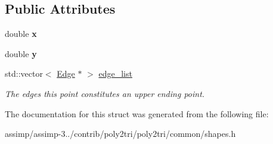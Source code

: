 \subsection*{Public Attributes}
\begin{DoxyCompactItemize}
\item 
\hypertarget{structp2t_1_1_point_a49ca18e331005473fabe8352ae30aa87}{double {\bfseries x}}\label{structp2t_1_1_point_a49ca18e331005473fabe8352ae30aa87}

\item 
\hypertarget{structp2t_1_1_point_ac145d2fc2a314ba5d1f5f93b32888313}{double {\bfseries y}}\label{structp2t_1_1_point_ac145d2fc2a314ba5d1f5f93b32888313}

\item 
\hypertarget{structp2t_1_1_point_a116c82146cc0bf573baac56c77a9f90a}{std\+::vector$<$ \hyperlink{structp2t_1_1_edge}{Edge} $\ast$ $>$ \hyperlink{structp2t_1_1_point_a116c82146cc0bf573baac56c77a9f90a}{edge\+\_\+list}}\label{structp2t_1_1_point_a116c82146cc0bf573baac56c77a9f90a}

\begin{DoxyCompactList}\small\item\em The edges this point constitutes an upper ending point. \end{DoxyCompactList}\end{DoxyCompactItemize}


The documentation for this struct was generated from the following file\+:\begin{DoxyCompactItemize}
\item 
assimp/assimp-\/3../contrib/poly2tri/poly2tri/common/shapes.\+h\end{DoxyCompactItemize}
